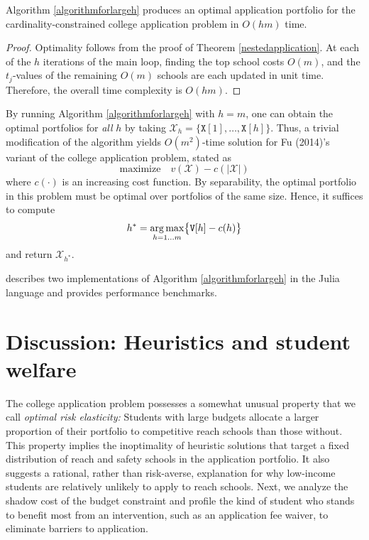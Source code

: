 \begin{theorem} \label{validityofalmaalgorithm}
Algorithm \ref{algorithmforlargeh} produces an optimal application portfolio for the cardinality-constrained college application problem in $O(h m)$ time.
\end{theorem}

\begin{proof}
Optimality follows from the proof of Theorem \ref{nestedapplication}. At each of the $h$ iterations of the main loop, finding the top school costs $O(m)$, and the $t_j$-values of the remaining $O(m)$ schools are each updated in unit time. Therefore, the overall time complexity is $O(h m)$.
\end{proof}

By running Algorithm \ref{algorithmforlargeh} with $h = m$, one can obtain the optimal portfolios for \emph{all} $h$ by taking $\mathcal{X}_h = \{ \mathtt{X}[1], \dots, \mathtt{X}[h]\}$. Thus, a trivial modification of the algorithm yields $O(m^2)$-time solution for Fu (2014)'s variant of the college application problem, stated as 
\[ \text{maximize} \quad v(\mathcal{X}) - c(|\mathcal{X}|)\]
where $c(\cdot)$ is an increasing cost function. By separability, the optimal portfolio in this problem must be optimal over portfolios of the same size. Hence, it suffices to compute
\[h^* = \operatorname*{arg\,max}_{h = 1 \dots m} \bigl\{\mathtt{V}[h] - c(h)\bigr\}\] and return $\mathcal{X}_{h^*}$.  

\cite{kapur2022} describes two implementations of Algorithm \ref{algorithmforlargeh} in the Julia language and provides performance benchmarks.





\section{Discussion: Heuristics and student welfare} \label{sectionDiscussion}

The college application problem possesses a somewhat unusual property that we call \emph{optimal risk elasticity:} Students with large budgets allocate a larger proportion of their portfolio to competitive reach schools than those without. This property implies the inoptimality of heuristic solutions that target a fixed distribution of reach and safety schools in the application portfolio. It also suggests a rational, rather than risk-averse, explanation for why low-income students are relatively unlikely to apply to reach schools. Next, we analyze the shadow cost of the budget constraint and profile the kind of student who stands to benefit most from an intervention, such as an application fee waiver, to eliminate barriers to application.


